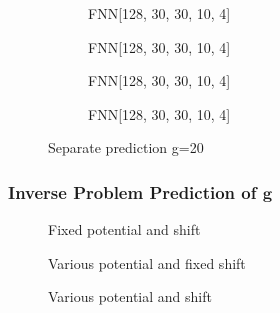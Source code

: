 \documentclass[a4paper,times,12pt]{article}
\begin{document}
\begin{figure}[H]
    \centering
    \begin{subfigure}[t]{0.45\textwidth}
		\centering
        
        \caption{FNN[128, 30, 30, 10, 4]}
		\label{fig:a}
    \end{subfigure}\hfill
    \begin{subfigure}[t]{0.45\textwidth}
		\centering
        
        \caption{FNN[128, 30, 30, 10, 4]}
		\label{fig:b}
    \end{subfigure}\hfill    
    \begin{subfigure}[t]{0.45\textwidth}
        \centering
        
        \caption{FNN[128, 30, 30, 10, 4]}
		\label{fig:c}
    \end{subfigure}\hfill
    \begin{subfigure}[t]{0.45\textwidth}
        \centering
        
        \caption{FNN[128, 30, 30, 10, 4]}
		\label{fig:c}
    \end{subfigure}
	\caption{Separate prediction  g=20}
\end{figure}

\subsubsection{Inverse Problem Prediction of $\boldsymbol{g}$}


\begin{figure}[H]
    \centering
    
    \caption{Fixed potential and shift}
	\label{fig:a}
\end{figure}

\begin{figure}[H]
    \centering
    
    \caption{Various potential and fixed shift}
	\label{fig:a}
\end{figure}

\begin{figure}[H]
    \centering
    
    \caption{Various potential and shift}
	\label{fig:a}
\end{figure}



\newpage
\end{document}
